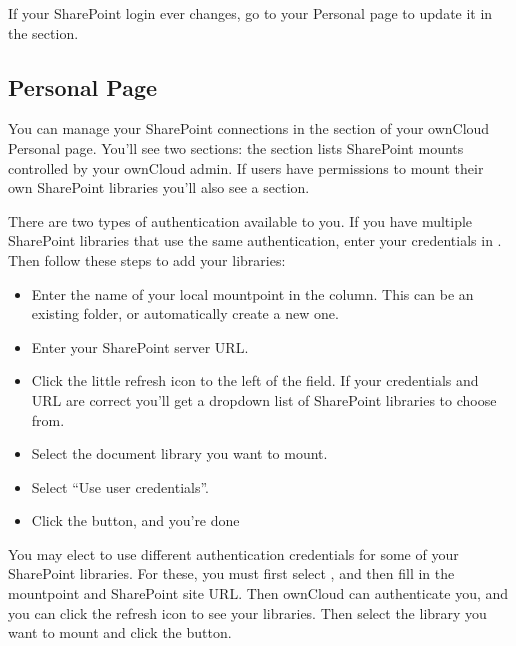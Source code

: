 \documentclass[letterpaper,10pt,english]{sphinxmanual}
\begin{document}
If your SharePoint login ever changes, go to your Personal page to update it in
the  section.


\subsection{Personal Page}
\label{external_storage/sharepoint_connecting:personal-page}
You can manage your SharePoint connections in the  section of your ownCloud Personal page. You'll see two sections:
the  section lists SharePoint mounts controlled by
your ownCloud admin. If users have permissions to mount their own SharePoint
libraries you'll also see a  section.

There are two types of authentication available to you. If you have multiple
SharePoint libraries that use the same authentication, enter your credentials
in . Then follow these steps to add your
libraries:
\begin{itemize}
\item {} 
Enter the name of your local mountpoint in the  column.
This can be an existing folder, or automatically create a new one.

\item {} 
Enter your SharePoint server URL.

\item {} 
Click the little refresh icon to the left of the  field.
If your credentials and URL are correct you'll get a dropdown list of SharePoint
libraries to choose from.

\item {} 
Select the document library you want to mount.

\item {} 
Select ``Use user credentials''.

\item {} 
Click the  button, and you're done

\end{itemize}

You may elect to use different authentication credentials for some of your
SharePoint libraries. For these, you must first select , and then fill in the mountpoint and SharePoint site URL. Then
ownCloud can authenticate you, and you can click the refresh icon to see your
libraries. Then select the library you want to mount and click the 
button.
\end{document}
